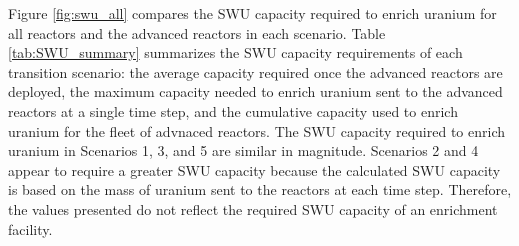 Figure \ref{fig:swu_all} compares the \gls{SWU} capacity required to enrich uranium for 
all reactors and the advanced reactors in each scenario. Table \ref{tab:SWU_summary} 
summarizes the \gls{SWU} capacity 
requirements of each transition scenario: the average capacity required once the 
advanced reactors are deployed, the maximum capacity needed to enrich uranium sent to 
the advanced reactors at a single time step, and the cumulative capacity used to enrich 
uranium for the fleet of advnaced reactors. The \gls{SWU} capacity required 
to enrich uranium in Scenarios 1, 3, and 5 are similar in magnitude. Scenarios 2 and 4
appear to require a greater \gls{SWU} capacity because the calculated \gls{SWU} capacity 
is based on the mass of uranium sent to the reactors at each time step. Therefore, 
the values presented do not reflect the required \gls{SWU} capacity of 
an enrichment facility. 

